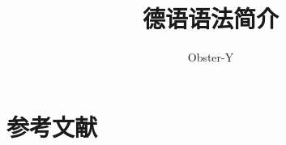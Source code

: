 \documentclass[
    use boldface,
    ]{einfart}
\begin{document}
\title{德语语法简介}
\author{Obster-Y}
\date{}
\maketitle
\tableofcontents








\section{参考文献}
\nocite{*}
\printbibliography[heading=none]


\end{document}
